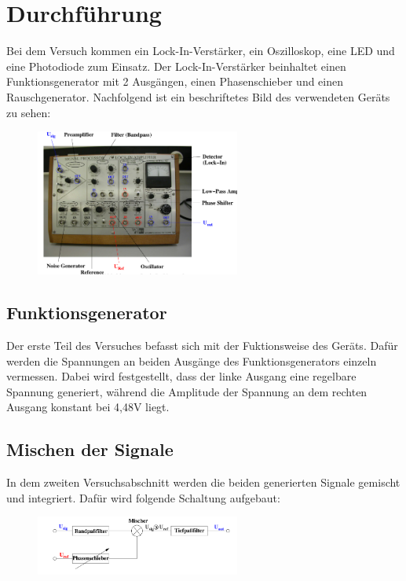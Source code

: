 \section{Durchführung}
\label{sec:Durchführung}

Bei dem Versuch kommen ein Lock-In-Verstärker, ein Oszilloskop, eine
LED und eine Photodiode zum Einsatz. Der Lock-In-Verstärker beinhaltet
einen Funktionsgenerator  mit 2 Ausgängen, einen Phasenschieber und einen
Rauschgenerator. Nachfolgend ist ein beschriftetes Bild des verwendeten Geräts
zu sehen:
\begin{figure}[H]
  \centering
  \includegraphics[keepaspectratio, width=0.6\textwidth]{geraet.png}
  \label{fig:gerät}
\end{figure}
\cite[3]{Anleitung}


\subsection{Funktionsgenerator}
Der erste Teil des Versuches befasst sich mit der Fuktionsweise des Geräts.
Dafür werden die Spannungen an beiden Ausgänge des Funktionsgenerators einzeln
vermessen. Dabei wird festgestellt, dass der linke Ausgang eine regelbare
Spannung generiert, während die Amplitude der Spannung an dem rechten
Ausgang konstant bei 4,48V liegt.

\subsection{Mischen der Signale}
In dem zweiten Versuchsabschnitt werden die beiden generierten Signale gemischt
und integriert. Dafür wird folgende Schaltung aufgebaut:

\begin{figure}
  \centering
  \includegraphics[keepaspectratio, width=0.6\textwidth]{Schaltung1.png}
  \label{fig:Schaltung1}
\end{figure}
\cite[1]{Anleitung}\\

